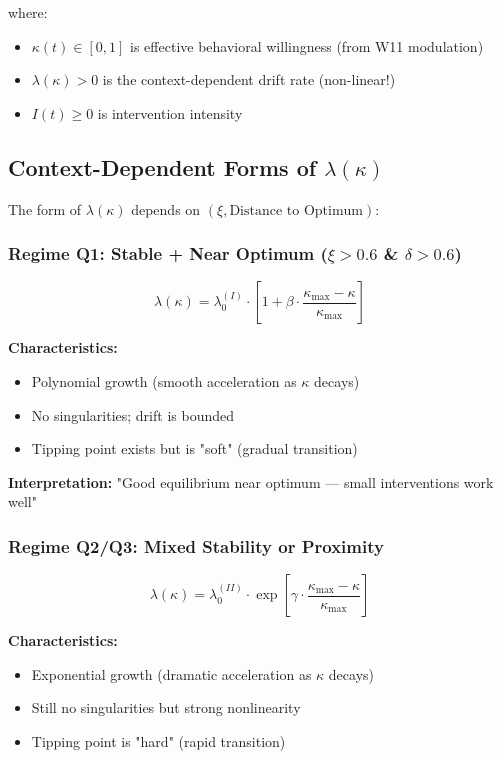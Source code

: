 \documentclass[11pt, a4paper]{article}
\begin{document}
\noindent
where:
\begin{itemize}
    \item $\kappa(t) \in [0, 1]$ is effective behavioral willingness (from W11 modulation)
    \item $\lambda(\kappa) > 0$ is the context-dependent drift rate (non-linear!)
    \item $I(t) \geq 0$ is intervention intensity
\end{itemize}

\subsection{Context-Dependent Forms of $\lambda(\kappa)$}

The form of $\lambda(\kappa)$ depends on $(\xi, \text{Distance to Optimum})$:

\subsubsection{Regime Q1: Stable + Near Optimum ($\xi > 0.6$ \& $\delta > 0.6$)}

\begin{equation}
\lambda(\kappa) = \lambda_0^{(I)} \cdot \left[1 + \beta \cdot \frac{\kappa_{\max} - \kappa}{\kappa_{\max}}\right]
\end{equation}

\noindent
\textbf{Characteristics:}
\begin{itemize}
    \item Polynomial growth (smooth acceleration as $\kappa$ decays)
    \item No singularities; drift is bounded
    \item Tipping point exists but is "soft" (gradual transition)
\end{itemize}

\noindent
\textbf{Interpretation:} "Good equilibrium near optimum — small interventions work well"

\subsubsection{Regime Q2/Q3: Mixed Stability or Proximity}

\begin{equation}
\lambda(\kappa) = \lambda_0^{(II)} \cdot \exp\left[\gamma \cdot \frac{\kappa_{\max} - \kappa}{\kappa_{\max}}\right]
\end{equation}

\noindent
\textbf{Characteristics:}
\begin{itemize}
    \item Exponential growth (dramatic acceleration as $\kappa$ decays)
    \item Still no singularities but strong nonlinearity
    \item Tipping point is "hard" (rapid transition)
\end{itemize}
\end{document}
